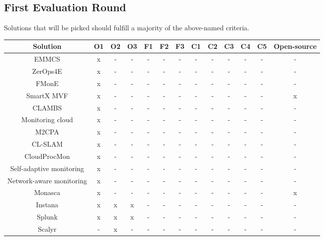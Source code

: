 \subsection{First Evaluation Round}

Solutions that will be picked should fulfill a majority of the above-named criteria.

\begin{longtable}{|c|c|c|c|c|c|c|c|c|c|c|c|c|}
\hline
Solution                        & O1 & O2 & O3 & F1 & F2 & F3 & C1 & C2 & C3 & C4 & C5 & Open-source \\ \hline
EMMCS                           & x  & -  & -  & -  & -  & -  & -  & -  & -  & -  & -  & -  \\ \hline
ZerOps4E                        & x  & -  & -  & -  & -  & -  & -  & -  & -  & -  & -  & -  \\ \hline
FMonE                           & x  & -  & -  & -  & -  & -  & -  & -  & -  & -  & -  & -  \\ \hline
SmartX MVF                      & x  & -  & -  & -  & -  & -  & -  & -  & -  & -  & -  & x  \\ \hline
CLAMBS                          & x  & -  & -  & -  & -  & -  & -  & -  & -  & -  & -  & -  \\ \hline
Monitoring cloud                & x  & -  & -  & -  & -  & -  & -  & -  & -  & -  & -  & -  \\ \hline
M2CPA                           & x  & -  & -  & -  & -  & -  & -  & -  & -  & -  & -  & -  \\ \hline
CL-SLAM                         & x  & -  & -  & -  & -  & -  & -  & -  & -  & -  & -  & -  \\ \hline
CloudProcMon                    & x  & -  & -  & -  & -  & -  & -  & -  & -  & -  & -  & -  \\ \hline
Self-adaptive monitoring        & x  & -  & -  & -  & -  & -  & -  & -  & -  & -  & -  & -  \\ \hline
Network-aware monitoring        & x  & -  & -  & -  & -  & -  & -  & -  & -  & -  & -  & -  \\ \hline
Monasca                         & x  & -  & -  & -  & -  & -  & -  & -  & -  & -  & -  & x  \\ \hline
Instana                         & x  & x  & x  & -  & -  & -  & -  & -  & -  & -  & -  & -  \\ \hline
Splunk                          & x  & x  & x  & -  & -  & -  & -  & -  & -  & -  & -  & -  \\ \hline
Scalyr                          & -  & x  & -  & -  & -  & -  & -  & -  & -  & -  & -  & -  \\ \hline

\end{longtable}
